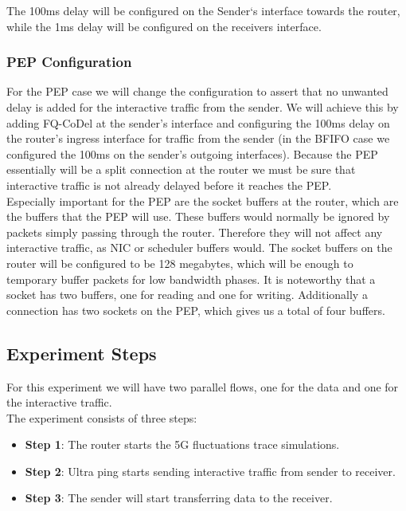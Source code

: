 \documentclass[a4paper,english, 12pt]{report}
\begin{document}
The 100ms delay will be configured on the Sender`s interface towards the router, while the 1ms delay will be configured on the receivers interface.

\subsubsection{PEP Configuration}
For the PEP case we will change the configuration to assert that no unwanted delay is added for the interactive traffic from the sender. We will achieve this by adding FQ-CoDel at the sender's interface and configuring the 100ms delay on the router's ingress interface for traffic from the sender (in the BFIFO case we configured the 100ms on the sender's outgoing interfaces). Because the PEP essentially will be a split connection at the router we must be sure that interactive traffic is not already delayed before it reaches the PEP.\\

Especially important for the PEP are the socket buffers at the router, which are the buffers that the PEP will use. These buffers would normally be ignored by packets simply passing through the router. Therefore they will not affect any interactive traffic, as NIC or scheduler buffers would. The socket buffers on the router will be configured to be 128 megabytes, which will be enough to temporary buffer packets for low bandwidth phases. It is noteworthy that a socket has two buffers, one for reading and one for writing. Additionally a connection has two sockets on the PEP, which gives us a total of four buffers.\\

\subsection{Experiment Steps}
For this experiment we will have two parallel flows, one for the data and one for the interactive traffic.\\

The experiment consists of three steps:
\begin{itemize}
  \item \textbf{Step 1}: The router starts the 5G fluctuations trace simulations.
  \item \textbf{Step 2}: Ultra ping starts sending interactive traffic from sender to receiver.
  \item \textbf{Step 3}: The sender will start transferring data to the receiver.
\end{itemize}
\end{document}
